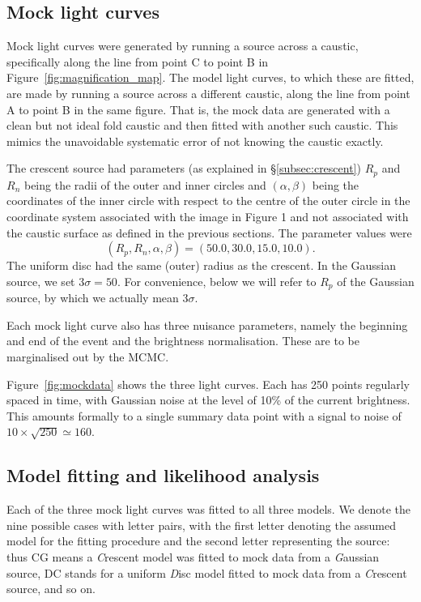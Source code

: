 \documentclass[usenatbib]{mn2e}
\begin{document}
\subsection{Mock light curves}

Mock light curves were generated by running a source across a
caustic, specifically along the line from point C to point B in
Figure~\ref{fig:magnification_map}.  The model light curves, to which
these are fitted, are made by running a source across a different
caustic, along the line from point A to point B in the same figure.
That is, the mock data are generated with a clean but not ideal fold
caustic and then fitted with another such caustic.  This mimics the
unavoidable systematic error of not knowing the caustic exactly.

The crescent source had parameters (as explained in
\S\ref{subsec:crescent}) $R_p$ and $R_n$ being the radii of the outer
and inner circles and $(\alpha,\beta)$ being the coordinates of the
inner circle with respect to the centre of the outer circle in the
coordinate system associated with the image in Figure 1 and not
associated with the caustic surface as defined in the previous
sections.  The parameter values were
\begin{equation}
   (R_p, R_n, \alpha, \beta) = (50.0, 30.0, 15.0, 10.0).
\label{eqn:cp}
\end{equation}
The uniform disc had the same (outer) radius as the crescent.  In the
Gaussian source, we set $3\sigma=50$.  For convenience, below we will
refer to $R_p$ of the Gaussian source, by which we actually mean
$3\sigma$.

Each mock light curve also has three nuisance parameters, namely the
beginning and end of the event and the brightness normalisation.
These are to be marginalised out by the MCMC.

Figure~\ref{fig:mockdata} shows the three light curves.  Each has 250
points regularly spaced in time, with Gaussian noise at the level of
10\% of the current brightness.  This amounts formally to a single
summary data point with a signal to noise of
$10\times\sqrt{250}\simeq160$.

\subsection{Model fitting and likelihood analysis}

Each of the three mock light curves was fitted to all three models.
We denote the nine possible cases with letter pairs, with the first
letter denoting the assumed model for the fitting procedure and 
the second letter representing
the source: thus CG means a {\em C\/}rescent model was fitted to mock
data from a {\em G\/}aussian source, DC stands for a uniform {\em
  D\/}isc model fitted to mock data from a {\em C\/}rescent source,
and so on.
\end{document}
